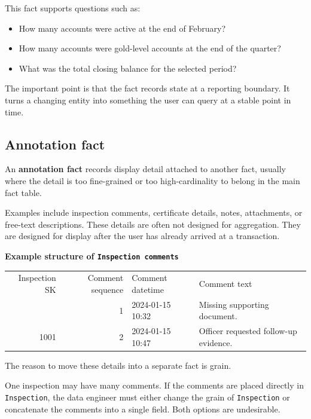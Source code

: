 \documentclass[10pt,openany,10pt]{book}
\providecommand{\tightlist}{%
  \setlength{\itemsep}{0pt}\setlength{\parskip}{0pt}}
\newcounter{none}
\let\podeToprule\toprule
\let\podeMidrule\midrule
\let\podeBottomrule\bottomrule
\renewcommand{\toprule}{\arrayrulecolor{pbiGrid}\podeToprule}
\renewcommand{\midrule}{\arrayrulecolor{pbiGrid}\podeMidrule}
\renewcommand{\bottomrule}{\arrayrulecolor{pbiGrid}\podeBottomrule}
\begin{document}
This fact supports questions such as:

\begin{itemize}
\tightlist
\item
  How many accounts were active at the end of February?
\item
  How many accounts were gold-level accounts at the end of the quarter?
\item
  What was the total closing balance for the selected period?
\end{itemize}

The important point is that the fact records state at a reporting
boundary. It turns a changing entity into something the user can query
at a stable point in time.

\subsection{Annotation fact}\label{annotation-fact}

An \textbf{annotation fact} records display detail attached to another
fact, usually where the detail is too fine-grained or too
high-cardinality to belong in the main fact table.

Examples include inspection comments, certificate details, notes,
attachments, or free-text descriptions. These details are often not
designed for aggregation. They are designed for display after the user
has already arrived at a transaction.

\textbf{Example structure of
\texttt{\textquotesingle{}Inspection\ comments\textquotesingle{}}}

{\def\LTcaptype{none} %
\begin{longtable}[]{@{}rrll@{}}
\toprule\noalign{}
Inspection SK & Comment sequence & Comment datetime & Comment text \\
\midrule\noalign{}
\endhead
\bottomrule\noalign{}
\endlastfoot
1001 & 1 & 2024-01-15 10:32 & Missing supporting document. \\
1001 & 2 & 2024-01-15 10:47 & Officer requested follow-up evidence. \\
\end{longtable}
}

The reason to move these details into a separate fact is grain.

One inspection may have many comments. If the comments are placed
directly in \texttt{\textquotesingle{}Inspection\textquotesingle{}}, the
data engineer must either change the grain of
\texttt{\textquotesingle{}Inspection\textquotesingle{}} or concatenate
the comments into a single field. Both options are undesirable.
\end{document}
